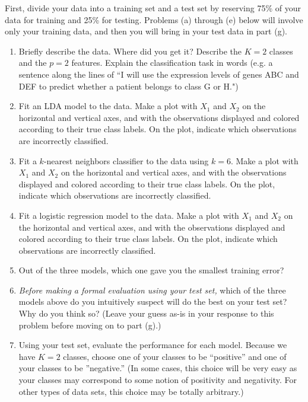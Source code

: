 \documentclass[12pt]{article}
\begin{document}
\begin{enumerate}
   First, divide your data into a training set and a test set by reserving 75\% of your data for training and 25\% for testing. Problems (a) through (e) below will involve only your training data, and then you will bring in your test data in part (g).
\begin{enumerate}

\item Briefly describe the data. Where did you get it? Describe the $K=2$ classes and the $p=2$ features. Explain the classification task in words (e.g. a sentence along the lines of ``I will use the expression levels of genes ABC and DEF to predict whether a patient belongs to class G or H.")
\item Fit an LDA model to the data. Make a plot with $X_1$ and $X_2$ on the horizontal and vertical axes, and with the observations displayed and colored according to their true class labels. On the plot, indicate which observations are incorrectly classified. 
\item Fit a $k$-nearest neighbors classifier to the data using $k=6$. Make a plot with $X_1$ and $X_2$ on the horizontal and vertical axes, and with the observations displayed and colored according to their true class labels. On the plot, indicate which observations are incorrectly classified. 
\item Fit a logistic regression model to the data. Make a plot with $X_1$ and $X_2$ on the horizontal and vertical axes, and with the observations displayed and colored according to their true class labels. On the plot, indicate which observations are incorrectly classified. 
\item Out of the three models, which one gave you the smallest training error? 
\item \textit{Before making a formal evaluation using your test set,} which of the three models above do you intuitively suspect will do the best on your test set? Why do you think so? (Leave your guess as-is in your response to this problem before moving on to part (g).)

\item Using your test set, evaluate the performance for each model. Because we have $K=2$ classes, choose one of your classes to be ``positive'' and one of your classes to be ''negative.'' (In some cases, this choice will be very easy as your classes may correspond to some notion of positivity and negativity. For other types of data sets, this choice may be totally arbitrary.)


\end{enumerate}
\end{enumerate}
\end{document}
